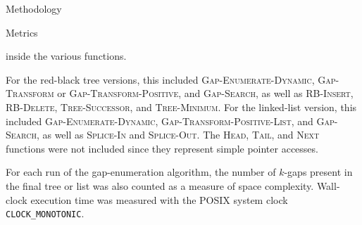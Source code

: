 \documentclass{article}
\begin{document}
\begin{section}{Methodology}
\begin{subsection}{Metrics}
\begin{paragraph}{}
      inside the various functions.
    \end{paragraph}
    \begin{paragraph}{}
      For the red-black tree versions, this included
      \textsc{Gap-Enumerate-Dynamic}, \textsc{Gap-Transform} or \textsc{Gap-Transform-Positive},
      and \textsc{Gap-Search}, as well as \textsc{RB-Insert}, \textsc{RB-Delete},
      \textsc{Tree-Successor}, and \textsc{Tree-Minimum}. For the linked-list
      version, this included \textsc{Gap-Enumerate-Dynamic}, \textsc{Gap-Transform-Positive-List},
      and \textsc{Gap-Search}, as well as \textsc{Splice-In} and \textsc{Splice-Out}.
      The \textsc{Head}, \textsc{Tail}, and \textsc{Next} functions were not included
      since they represent simple pointer accesses.
    \end{paragraph}
    \begin{paragraph}{}
      For each run of the gap-enumeration algorithm, the number of $k$-gaps present in
      the final tree or list was also counted as a measure of space complexity.
      Wall-clock execution time was measured with the POSIX system clock \texttt{CLOCK\_MONOTONIC}.
    \end{paragraph}
  \end{subsection}
\end{section}
\end{document}
